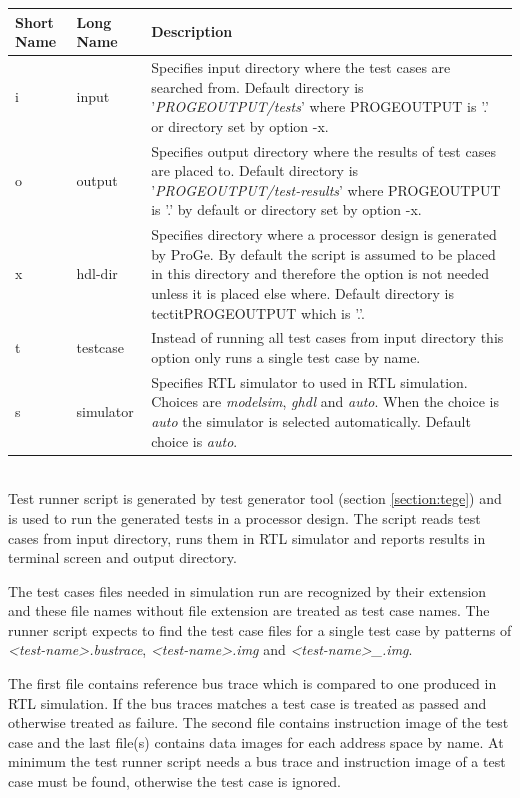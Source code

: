 \documentclass[a4paper,twoside]{tceusermanual}
\begin{document}
\begin{tabular}{p{}p{}
                p{}}

\textbf{Short Name} &\textbf{Long Name} &\textbf{Description} \\
\hline
i & input &
Specifies input directory where the test cases are searched from.
Default directory is '\textit{PROGEOUTPUT/tests}' where PROGEOUTPUT is
'.' or directory set by option -x. \\

o & output &
Specifies output directory where the results of test cases are placed
to.  Default directory is '\textit{PROGEOUTPUT/test-results}' where PROGEOUTPUT
is '.' by default or directory set by option -x. \\

x & hdl-dir &
Specifies directory where a processor design is generated by ProGe. By
default the script is assumed to be placed in this directory and
therefore the option is not needed unless it is placed else
where. Default directory is tectit{PROGEOUTPUT} which is '.'.\\

t & testcase &
Instead of running all test cases from input directory this option
only runs a single test case by name. \\

s & simulator &
Specifies RTL simulator to used in RTL simulation. Choices are
\textit{modelsim}, \textit{ghdl} and \textit{auto}. When the choice is
\textit{auto} the simulator is selected automatically. Default
choice is \textit{auto}. \\

\end{tabular} \\

Test runner script is generated by test generator tool (section
\ref{section:tege}) and is used to run the generated tests in a
processor design. The script reads test cases from input directory,
runs them in RTL simulator and reports results in terminal screen and
output directory.

The test cases files needed in simulation run are recognized by their
extension and these file names without file extension are treated as
test case names. The runner script expects to find the test case files
for a single test case by patterns of \textit{<test-name>.bustrace},
\textit{<test-name>.img} and
\textit{<test-name>\_<address-space-name>.img}.

The first file contains reference bus trace which is compared to one
produced in RTL simulation. If the bus traces matches a test case is
treated as passed and otherwise treated as failure. The second file
contains instruction image of the test case and the last file(s)
contains data images for each address space by name. At minimum the
test runner script needs a bus trace and instruction image of a test
case must be found, otherwise the test case is ignored.
\end{document}
